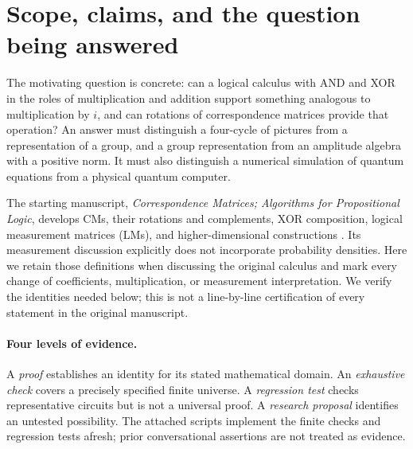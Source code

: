 \section{Scope, claims, and the question being answered}\label{sec:scope}
The motivating question is concrete: can a logical calculus with AND and XOR in the roles of multiplication and addition support something analogous to multiplication by $i$, and can rotations of correspondence matrices provide that operation? An answer must distinguish a four-cycle of pictures from a representation of a group, and a group representation from an amplitude algebra with a positive norm. It must also distinguish a numerical simulation of quantum equations from a physical quantum computer.

The starting manuscript, \emph{Correspondence Matrices; Algorithms for Propositional Logic}, develops CMs, their rotations and complements, XOR composition, logical measurement matrices (LMs), and higher-dimensional constructions \cite{droncheff}. Its measurement discussion explicitly does not incorporate probability densities. Here we retain those definitions when discussing the original calculus and mark every change of coefficients, multiplication, or measurement interpretation. We verify the identities needed below; this is not a line-by-line certification of every statement in the original manuscript.

\paragraph{Four levels of evidence.}
A \emph{proof} establishes an identity for its stated mathematical domain. An \emph{exhaustive check} covers a precisely specified finite universe. A \emph{regression test} checks representative circuits but is not a universal proof. A \emph{research proposal} identifies an untested possibility. The attached scripts implement the finite checks and regression tests afresh; prior conversational assertions are not treated as evidence.


